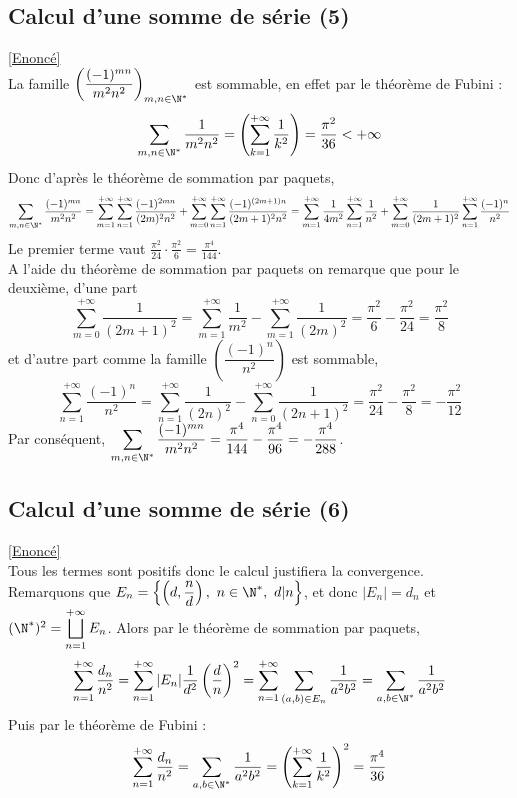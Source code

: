 \documentclass{book}
\begin{document}
	\subsection{Calcul d'une somme de série (5) }
	\label{Calcul d'une somme de série (5) corrigé}
	\textcolor{blue}{\hyperref[Calcul d'une somme de série (4)]{[Enoncé]}}\\
	La famille $\left(\dfrac{(-1)^{mn}}{m^2n^2}\right)_{m,n\in \N^*}$ est sommable, en effet par le théorème de Fubini :
	$$\sum_{m,n\in \N^*}\frac{1}{m^2n^2}=\left(\sum_{k=1}^{+\infty}\frac{1}{k^2}\right)=\frac{\pi^2}{36}<+\infty$$
	Donc d'après le théorème de sommation par paquets,
	$$\sum_{m,n\in \N^*}\frac{(-1)^{mn}}{m^2n^2}=\sum_{m=1}^{+\infty}\sum_{n=1}^{+\infty}\frac{(-1)^{2mn}}{(2m)^2n^2}+\sum_{m=0}^{+\infty}\sum_{n=1}^{+\infty}\frac{(-1)^{(2m+1)n}}{(2m+1)^2n^2}=\sum_{m=1}^{+\infty}\frac{1}{4m^2}\sum_{n=1}^{+\infty}\frac{1}{n^2}+\sum_{m=0}^{+\infty}\frac{1}{(2m+1)^2}\sum_{n=1}^{+\infty}\frac{(-1)^n}{n^2}$$
	Le premier terme vaut $\displaystyle\frac{\pi^2}{24}\cdot\frac{\pi^2}{6}=\frac{\pi^4}{144}$.\\
	A l'aide du théorème de sommation par paquets on remarque que pour le deuxième, d'une part $$\sum_{m=0}^{+\infty}\frac{1}{(2m+1)^2}=\sum_{m=1}^{+\infty}\frac{1}{m^2}-\sum_{m=1}^{+\infty}\frac{1}{(2m)^2}=\frac{\pi^2}{6}-\frac{\pi^2}{24}=\frac{\pi^2}{8}$$
	et d'autre part comme la famille $\left(\dfrac{(-1)^n}{n^2}\right)$ est sommable,
	$$\sum_{n=1}^{+\infty}\frac{(-1)^n}{n^2}=\sum_{n=1}^{+\infty}\frac{1}{(2n)^2}-\sum_{n=0}^{+\infty}\frac{1}{(2n+1)^2}=\frac{\pi^2}{24}-\frac{\pi^2}{8}=-\frac{\pi^2}{12}$$
	Par conséquent, $\displaystyle\sum_{m,n\in \N^*}\frac{(-1)^{mn}}{m^2n^2}=\frac{\pi^4}{144}-\frac{\pi^4}{96}=-\frac{\pi^4}{288}$.
	
	\subsection{Calcul d'une somme de série (6) }
	\label{Calcul d'une somme de série (6) corrigé}
	\textcolor{blue}{\hyperref[Calcul d'une somme de série (6)]{[Enoncé]}}\\
	Tous les termes sont positifs donc le calcul justifiera la convergence.\\
	Remarquons que $E_n=\left\{\left(d,\dfrac{n}{d}\right),\ n\in \N^*,\ d|n\right\}$, et donc $|E_n|=d_n$ et $(\N^*)^2=\displaystyle \bigsqcup_{n=1}^{+\infty}E_n$. Alors par le théorème de sommation par paquets,\\
	$$\sum_{n=1}^{+\infty}\frac{d_n}{n^2}=\sum_{n=1}^{+\infty}|E_n|\frac{1}{d^2}\left(\frac{d}{n}\right)^2=\sum_{n=1}^{+\infty}\sum_{(a,b)\in E_n}\frac{1}{a^2b^2}=\sum_{a,b\in \N^*}\frac{1}{a^2b^2}$$
	Puis par le théorème de Fubini :
	$$\sum_{n=1}^{+\infty}\frac{d_n}{n^2}=\sum_{a,b\in \N^*}\frac{1}{a^2b^2}=\left(\sum_{k=1}^{+\infty}\frac{1}{k^2}\right)^2=\frac{\pi^4}{36}$$
	
\end{document}
